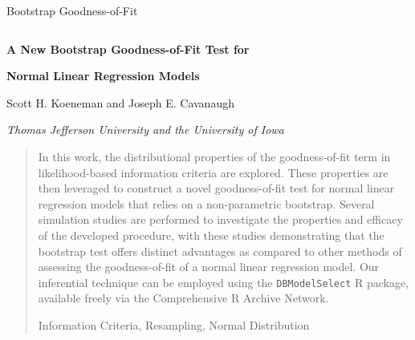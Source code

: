 \documentclass[12pt]{article} %
\theoremstyle{definition}
\begin{document}


\renewcommand{\baselinestretch}{2}

\markright{ \hbox{\footnotesize\rm %
}\hfill\\[-13pt]
\hbox{\footnotesize\rm
}\hfill }

{\hfill {\footnotesize\rm Bootstrap Goodness-of-Fit} \hfill}

\renewcommand{\thefootnote}{}
$\ $\par


\fontsize{12}{14pt plus.8pt minus .6pt}\selectfont \vspace{0.8pc}
\centerline{\large\bf A New Bootstrap Goodness-of-Fit Test for}
\vspace{2pt} 
\centerline{\large\bf Normal Linear Regression Models}
\vspace{.4cm} 
\centerline{Scott H. Koeneman and Joseph E. Cavanaugh} 
\vspace{.4cm} 
\centerline{\it Thomas Jefferson University and the University of Iowa}
 \vspace{.55cm} \fontsize{9}{11.5pt plus.8pt minus.6pt}\selectfont


\begin{quotation}
In this work, the distributional properties of the goodness-of-fit term in likelihood-based information criteria are explored. These properties are then leveraged
to construct a novel goodness-of-fit test for normal linear regression models that relies on a non-parametric bootstrap. Several simulation studies are performed to
investigate the properties and efficacy of the developed procedure, with these studies demonstrating that the bootstrap test offers distinct advantages as compared
to other methods of assessing the goodness-of-fit of a normal linear regression model. Our inferential technique can be employed using the \verb|DBModelSelect| R package,
available freely via the Comprehensive R Archive Network.


\vspace{9pt}
Information Criteria, Resampling, Normal Distribution
\par
\end{quotation}\par
\end{document}
